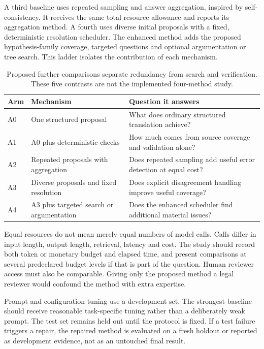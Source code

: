 A third baseline uses repeated sampling and answer aggregation, inspired by
self-consistency. It receives the same total resource allowance and reports its
aggregation method. A fourth uses diverse initial proposals with a fixed,
deterministic resolution scheduler. The enhanced method adds the proposed
hypothesis-family coverage, targeted questions and optional argumentation or tree
search. This ladder isolates the contribution of each mechanism.

\begin{table}[H]
\centering
\caption{Proposed further comparisons separate redundancy from search and verification. These five contrasts are not the implemented four-method study.}
\begin{tabularx}{\textwidth}{P{16mm}YY}
\toprule
Arm & Mechanism & Question it answers\\
\midrule
A0 & One structured proposal & What does ordinary structured translation achieve?\\
\addlinespace[0.5em]
A1 & A0 plus deterministic checks & How much comes from source coverage and validation alone?\\
\addlinespace[0.5em]
A2 & Repeated proposals with aggregation & Does repeated sampling add useful error detection at equal cost?\\
\addlinespace[0.5em]
A3 & Diverse proposals and fixed resolution & Does explicit disagreement handling improve useful coverage?\\
\addlinespace[0.5em]
A4 & A3 plus targeted search or argumentation & Does the enhanced scheduler find additional material issues?\\
\bottomrule
\end{tabularx}
\end{table}


Equal resources do not mean merely equal numbers of model calls. Calls differ in
input length, output length, retrieval, latency and cost. The study should record
both token or monetary budget and elapsed time, and present comparisons at
several predeclared budget levels if that is part of the question. Human reviewer
access must also be comparable. Giving only the proposed method a legal reviewer
would confound the method with extra expertise.

Prompt and configuration tuning use a development set. The strongest baseline
should receive reasonable task-specific tuning rather than a deliberately weak
prompt. The test set remains held out until the protocol is fixed. If a test
failure triggers a repair, the repaired method is evaluated on a fresh holdout or
reported as development evidence, not as an untouched final result.


